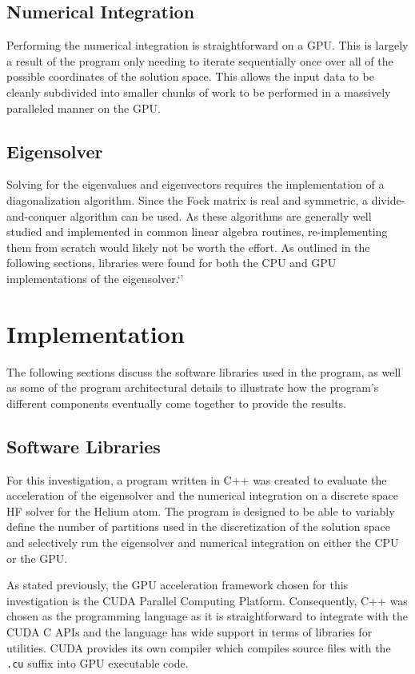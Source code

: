 \documentclass[conference, twoside]{IEEEtran}
\begin{document}
\subsection{Numerical Integration}

Performing the numerical integration is straightforward on a GPU. This is largely a result of the program only needing to iterate sequentially once over all of the possible coordinates of the solution space. This allows the input data to be cleanly subdivided into smaller chunks of work to be performed in a massively paralleled manner on the GPU.

\subsection{Eigensolver}

Solving for the eigenvalues and eigenvectors requires the implementation of a diagonalization algorithm. Since the Fock matrix is real and symmetric, a divide-and-conquer algorithm can be used. As these algorithms are generally well studied and implemented in common linear algebra routines, re-implementing them from scratch would likely not be worth the effort. As outlined in the following sections, libraries were found for both the CPU and GPU implementations of the eigensolver.`'

\section{Implementation} %

The following sections discuss the software libraries used in the program, as well as some of the program architectural details to illustrate how the program's different components eventually come together to provide the results.

\subsection{Software Libraries} %

For this investigation, a program written in C++ was created to evaluate the acceleration of the eigensolver and the numerical integration on a discrete space HF solver for the Helium atom. The program is designed to be able to variably define the number of partitions used in the discretization of the solution space and selectively run the eigensolver and numerical integration on either the CPU or the GPU.

As stated previously, the GPU acceleration framework chosen for this investigation is the CUDA Parallel Computing Platform. Consequently, C++ was chosen as the programming language as it is straightforward to integrate with the CUDA C APIs and the language has wide support in terms of libraries for utilities. CUDA provides its own compiler which compiles source files with the \texttt{.cu} suffix into GPU executable code.
\end{document}

